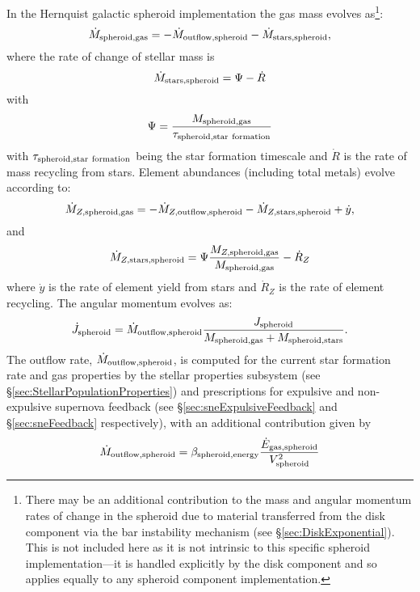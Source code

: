 In the Hernquist galactic spheroid implementation the gas mass evolves as\footnote{There may be an additional contribution to the mass and angular momentum rates of change in the spheroid due to material transferred from the disk component via the bar instability mechanism (see \S\protect\ref{sec:DiskExponential}). This is not included here as it is not intrinsic to this specific spheroid implementation---it is handled explicitly by the disk component and so applies equally to any spheroid component implementation.}:
\begin{equation}
 \dot{M}_{\rm spheroid, gas} = - \dot{M}_{\rm outflow, spheroid} - \dot{M}_{\rm stars, spheroid},
\end{equation}
where the rate of change of stellar mass is
\begin{equation}
 \dot{M}_{\rm stars, spheroid} = \Psi - \dot{R}
\end{equation}
with
\begin{equation}
 \Psi = {M_{\rm spheroid, gas} \over \tau_{\rm spheroid, star~formation}}
\end{equation}
with $\tau_{\rm spheroid, star~formation}$ being the star formation timescale and $\dot{R}$ is the rate of mass recycling from stars.
Element abundances (including total metals) evolve according to:
\begin{equation}
  \dot{M}_{Z, {\rm spheroid, gas}} = - \dot{M}_{Z, {\rm outflow, spheroid}} - \dot{M}_{Z, {\rm stars, spheroid}} + \dot{y},
\end{equation}
and
\begin{equation}
 \dot{M}_{Z, {\rm stars, spheroid}} = \Psi {M_{Z, {\rm spheroid, gas}} \over M_{\rm spheroid, gas}} - \dot{R}_Z
\end{equation}
where $\dot{y}$ is the rate of element yield from stars and $\dot{R}_Z$ is the rate of element recycling. The angular momentum evolves as:
\begin{equation}
 \dot{J}_{\rm spheroid} = \dot{M}_{\rm outflow, spheroid} {J_{\rm spheroid} \over M_{\rm spheroid, gas} + M_{\rm spheroid, stars}}.
\end{equation}
The outflow rate, $\dot{M}_{\rm outflow, spheroid}$, is computed for the current star formation rate and gas properties by the stellar properties subsystem (see \S\ref{sec:StellarPopulationProperties}) and prescriptions for expulsive and non-expulsive supernova feedback (see \S\ref{sec:sneExpulsiveFeedback} and \S\ref{sec:sneFeedback} respectively), with an additional contribution given by
\begin{equation}
 \dot{M}_{\rm outflow, spheroid} = \beta_{\rm spheroid, energy} {\dot{E}_{\rm gas, spheroid} \over V_{\rm spheroid}^2}
\end{equation}
